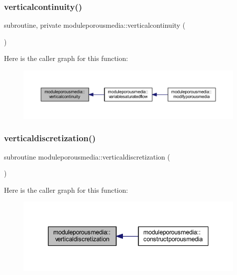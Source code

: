 \subsubsection{\texorpdfstring{verticalcontinuity()}{verticalcontinuity()}}
{\footnotesize\ttfamily subroutine, private moduleporousmedia\+::verticalcontinuity (\begin{DoxyParamCaption}{ }\end{DoxyParamCaption})\hspace{0.3cm}{\ttfamily [private]}}

Here is the caller graph for this function\+:\nopagebreak
\begin{figure}[H]
\begin{center}
\leavevmode
\includegraphics[width=350pt]{namespacemoduleporousmedia_a406def0f9f49282ca709c13afe389dff_icgraph}
\end{center}
\end{figure}
\mbox{\label{namespacemoduleporousmedia_ac906d07242e6b29b7b3f0b0984c50530}} 
\subsubsection{\texorpdfstring{verticaldiscretization()}{verticaldiscretization()}}
{\footnotesize\ttfamily subroutine moduleporousmedia\+::verticaldiscretization (\begin{DoxyParamCaption}{ }\end{DoxyParamCaption})\hspace{0.3cm}{\ttfamily [private]}}

Here is the caller graph for this function\+:\nopagebreak
\begin{figure}[H]
\begin{center}
\leavevmode
\includegraphics[width=339pt]{namespacemoduleporousmedia_ac906d07242e6b29b7b3f0b0984c50530_icgraph}
\end{center}
\end{figure}
\mbox{\label{namespacemoduleporousmedia_a98c9f7f64e2362f9f4a6d161dc8a7c99}} 
